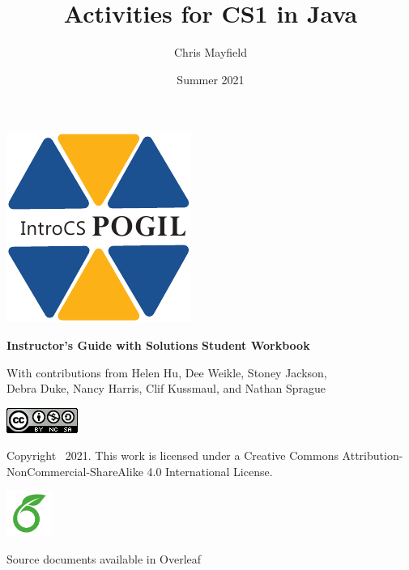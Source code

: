 \documentclass[12pt,twoside,openright]{report}
\title{Activities for CS1 in Java}
\author{Chris Mayfield}
\date{Summer 2021}
\begin{document}
\setcounter{page}{1}

\begin{titlepage}
\null\vfill
\centering

\includegraphics{../IntroCS.pdf}

\makeatletter

\vspace*{4em}
\huge \textbf{\@title}

\vspace*{2pt}
\ifdefined\Teacher
\color{DarkRed}
\Large \textbf{Instructor's Guide with Solutions}
\else
\color{ForestGreen}
\Large \textbf{Student Workbook}
\fi
\normalcolor

\vspace*{2em}
\large \@author

\vspace*{4pt}
\small With contributions from Helen Hu, Dee Weikle, Stoney Jackson, \\ Debra Duke, Nancy Harris, Clif Kussmaul, and Nathan Sprague

\vspace*{2em}
\Large \@date

\makeatother

\normalsize

\vspace*{4em}
\includegraphics{../by-nc-sa.png}

\vspace*{1ex}
Copyright \textcopyright\ 2021.
This work is licensed under a Creative Commons Attribution-NonCommercial-ShareAlike 4.0 International License.

\ifdefined\Teacher
\vspace*{2em}
\includegraphics[height=4em]{Overleaf.png}

\vspace*{1ex}
Source documents available in Overleaf
\fi

\vfill\null
\end{titlepage}
\end{document}
